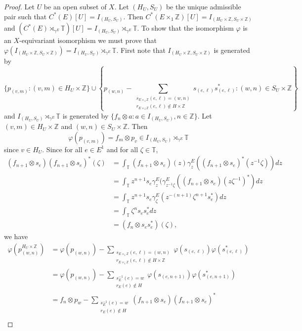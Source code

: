 \documentclass[12pt]{amsbook}%
\renewcommand{\phi}{\varphi}
\theoremstyle{defin}
\theoremstyle{remark}
\numberwithin{equation}{chapter}
\numberwithin{theor}{section}
\newcommand{\TT}{\mathbb{T}}
\newcommand{\ZZ}{\mathbb{Z}}
\begin{document}
\begin{proof}
Let $U$ be an open subset of $X$.  Let $(H_U, S_U)$ be the unique admissible pair such that $C^*(E)[U] = I_{(H_U, S_U)}$.  Then $C^*(E\times_1\ZZ) [ U ] = I_{ (H_U \times \ZZ, S_U \times \ZZ)}$ and $(C^*(E) \rtimes_{\gamma^E} \mathbb{T})[U] =  I_{ (H_U, S_U) } \rtimes_{\gamma^E} \mathbb{T}$.  To show that the isomorphism $\phi$ is an $X$-equivariant isomorphism we must prove that $\phi (  I_{ (H_U \times \ZZ, S_U \times \ZZ)  } ) =  I_{ (H_U, S_U) } \rtimes_{\gamma^E} \mathbb{T}$.  First note that $I_{(H_U \times \ZZ,  S_U \times \ZZ)}$ is generated by 
$$
\{ p_{(v,m)} : (v,m) \in H_U \times \ZZ \} \cup \left\{ p_{(w, n)} - \sum_{ \substack{  s_{E\times_1 \ZZ}( e, \ell ) =( w, n) \\  r_{E \times_1 \ZZ}( e, \ell ) \notin H \times \ZZ } } s_{ ( e, \ell ) } s_{ ( e, \ell ) }^* : (w, n) \in S_U \times \ZZ \right\}
$$   
and $I_{ (H_U, S_U) } \rtimes_{\gamma^E} \mathbb{T}$ is generated by $\{ f_n \otimes a : a \in I_{ (H_U , S_U)} , n \in \ZZ \}$.  Let $(v, m) \in H_U \times \ZZ$ and $(w, n) \in S_U \times \ZZ$.  Then 
\[
\phi ( p_{(v,m)} ) = f_m \otimes p_v \in I_{ (H_U, S_U)} \rtimes_{\gamma^E} \mathbb{T}
\]
since $v \in H_U$.   Since for all $e \in E^1$ and for all $\zeta \in \TT$,
\begin{align*}
(f_{n+1} \otimes s_{e})(f_{n+1} \otimes s_{e})^* (\zeta) &= \int_\TT ( f_{n+1} \otimes s_e)(z) \gamma_z^E ( ( f_{n+1} \otimes s_e)^*( z^{-1} \zeta ) ) dz \\
			&= \int_\TT z^{n+1} s_e \gamma_z^E ( \gamma_{z^{-1}\zeta}^E ( (f_{n+1} \otimes s_e )( z\zeta^{-1})^* ) dz \\
				&= \int_\TT z^{n+1} s_e \gamma_\zeta^E (  z^{-(n+1)} \zeta^{n+1} s_e^* ) dz \\
				&= \int_\TT  \zeta^{n} s_e s_e^* dz \\
				&= ( f_{n} \otimes s_{e} s_e^* )(\zeta),
\end{align*}
we have
\begin{align*}
\phi( p_{(w,n)}^{H_U \times \ZZ} ) &= \phi( p_{(w, n)}) - \sum_{ \substack{  s_{E\times_1 \ZZ}( e, \ell ) =( w, n) \\  r_{E \times_1 \ZZ}( e, \ell ) \notin H \times \ZZ } } \phi(s_{ ( e, \ell ) } ) \phi(s_{ ( e, \ell ) }^*) \\
&=  \phi( p_{(w, n)}) - \sum_{ \substack{ s_E^{-1}(e)=    w  \\ r_E(e) \notin H } }\phi(s_{ ( e, n+1 ) } ) \phi(s_{ ( e, n+1 ) }^*) \\
&= f_n \otimes p_w  - \sum_{ \substack{ s_E^{-1}(e)=    w \\ r_E(e) \notin H } } (f_{n+1} \otimes s_e)(f_{n+1} \otimes s_e)^* \\

\end{align*}
\end{proof}
\end{document}
